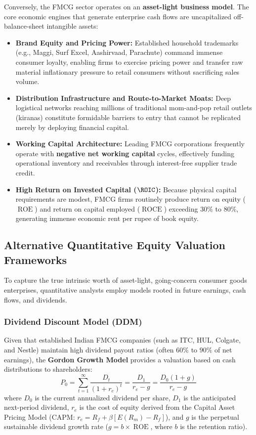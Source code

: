 Conversely, the FMCG sector operates on an \textbf{asset-light business model}. The core economic engines that generate enterprise cash flows are uncapitalized off-balance-sheet intangible assets:
\begin{itemize}
    \item \textbf{Brand Equity and Pricing Power:} Established household trademarks (e.g., Maggi, Surf Excel, Aashirvaad, Parachute) command immense consumer loyalty, enabling firms to exercise pricing power and transfer raw material inflationary pressure to retail consumers without sacrificing sales volume.
    \item \textbf{Distribution Infrastructure and Route-to-Market Moats:} Deep logistical networks reaching millions of traditional mom-and-pop retail outlets (kiranas) constitute formidable barriers to entry that cannot be replicated merely by deploying financial capital.
    \item \textbf{Working Capital Architecture:} Leading FMCG corporations frequently operate with \textbf{negative net working capital} cycles, effectively funding operational inventory and receivables through interest-free supplier trade credit.
    \item \textbf{High Return on Invested Capital ($\ROIC$):} Because physical capital requirements are modest, FMCG firms routinely produce return on equity ($\operatorname{ROE}$) and return on capital employed ($\operatorname{ROCE}$) exceeding $30\%$ to $80\%$, generating immense economic rent per rupee of book equity.
\end{itemize}

\subsection{Alternative Quantitative Equity Valuation Frameworks}
To capture the true intrinsic worth of asset-light, going-concern consumer goods enterprises, quantitative analysts employ models rooted in future earnings, cash flows, and dividends.

\subsubsection{Dividend Discount Model (DDM)}
Given that established Indian FMCG companies (such as ITC, HUL, Colgate, and Nestle) maintain high dividend payout ratios (often $60\%$ to $90\%$ of net earnings), the \textbf{Gordon Growth Model} provides a valuation based on cash distributions to shareholders:
\begin{equation}
    P_0 = \sum_{t=1}^{\infty} \frac{D_t}{(1 + r_e)^t} = \frac{D_1}{r_e - g} = \frac{D_0 (1 + g)}{r_e - g}
\end{equation}
where $D_0$ is the current annualized dividend per share, $D_1$ is the anticipated next-period dividend, $r_e$ is the cost of equity derived from the Capital Asset Pricing Model ($\text{CAPM}$: $r_e = R_f + \beta [E(R_m) - R_f]$), and $g$ is the perpetual sustainable dividend growth rate ($g = b \times \operatorname{ROE}$, where $b$ is the retention ratio).


